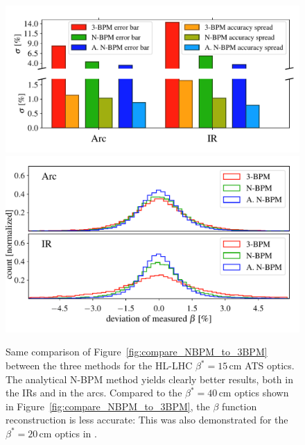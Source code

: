 \begin{figure}
	\centering
    \includegraphics[width=.7\linewidth]{comparison_statistics_HL007_bars}
    \\
    \includegraphics[width=.7\linewidth]{comparison_statistics_HL006}
	
	\caption{
        Same comparison of Figure~\ref{fig:compare_NBPM_to_3BPM} between the three methods for the
        HL-LHC $ \beta^*= 15\,\text{cm} $ ATS optics. The analytical N-BPM method yields clearly
        better results, both in the IRs and in the arcs. Compared to the $ \beta^*=40\,\text{cm} $
        optics shown in Figure~\ref{fig:compare_NBPM_to_3BPM}, the $ \beta $ function reconstruction
        is less accurate: This was also demonstrated for the $ \beta^*=20\,\text{cm} $ optics in
        \cite{LangnerNBPM}. }
	\label{fig:compare_ATS}
\end{figure}
%
